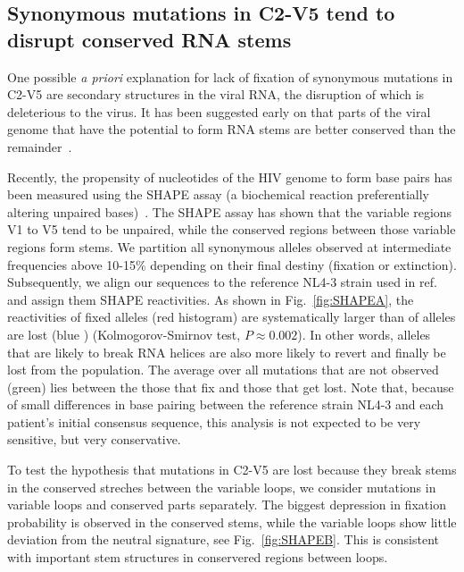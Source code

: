 \documentclass[rmp, twocolumn]{revtex4}
\newcommand{\FIG}[1]{Fig.~\ref{fig:#1}}
\begin{document}
\subsection{Synonymous mutations in C2-V5 tend to disrupt conserved RNA stems}
One possible {\it a priori} explanation for lack of fixation of synonymous
mutations in C2-V5 are secondary structures in the viral RNA, the disruption of
which is deleterious to the virus.
It has been suggested early on that parts of the viral genome that have the
potential to form RNA stems are better conserved than the
remainder~\citep{forsdyke_reciprocal_1995,snoeck_mapping_2011}.

Recently, the propensity of nucleotides of the HIV genome to form base pairs has
been measured using the SHAPE assay (a biochemical reaction preferentially
altering unpaired bases)~\citep{watts_architecture_2009}. The SHAPE assay has
shown that the variable regions V1 to V5 tend to be unpaired, while the
conserved regions between those variable regions form stems. We partition all
synonymous alleles observed at intermediate frequencies above 10-15\% depending
on their final destiny (fixation or extinction). Subsequently, we align our
sequences to the reference NL4-3 strain used in
ref.~\citep{watts_architecture_2009} and assign them SHAPE reactivities. As
shown in \FIG{SHAPEA}, the reactivities of fixed
alleles (red histogram) are systematically larger than of alleles are lost (blue
) (Kolmogorov-Smirnov test, $P\approx 0.002$).
In other words, alleles that are likely to break RNA helices are also more
likely to revert and finally be lost from the population. The
average over all mutations that are not observed (green) lies between the
those that fix and those that get lost.
Note that, because of small differences in base pairing between the reference
strain NL4-3 and each patient's initial consensus sequence, this analysis is not
expected to be very sensitive, but very conservative.

To test the hypothesis that mutations in C2-V5 are lost because they break stems in the
conserved streches between the variable loops, we consider mutations in
variable loops and conserved parts separately. The biggest depression in
fixation probability is observed in the conserved stems, while the variable
loops show little deviation from the neutral signature, see \FIG{SHAPEB}. This
is consistent with important stem structures in conservered regions between loops.
\end{document}
